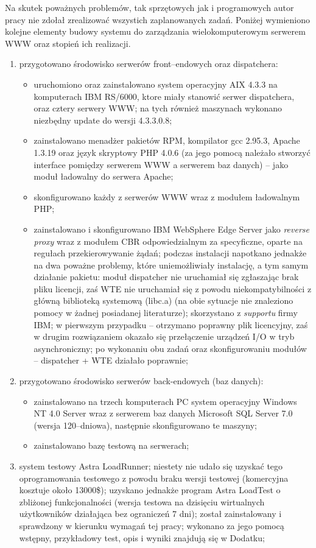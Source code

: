 Na skutek poważnych problemów, tak sprzętowych jak i programowych autor pracy nie zdołał 
zrealizować wszystich zaplanowanych zadań. Poniżej wymieniono kolejne elementy budowy systemu do zarządzania wielokomputerowym
serwerem WWW oraz stopień ich realizacji. 
\begin{enumerate}
\item przygotowano środowisko serwerów front--endowych oraz dispatchera:
\begin{itemize}
\item uruchomiono oraz zainstalowano system operacyjny AIX 4.3.3 na komputerach IBM RS/6000, ktore miały stanowić serwer
dispatchera, oraz cztery serwery WWW; na tych również maszynach wykonano niezbędny update do wersji 4.3.3.0.8;
\item zainstalowano menadżer pakietów RPM, kompilator gcc 2.95.3, Apache 1.3.19 oraz język skryptowy PHP 4.0.6 (za jego pomocą
należało stworzyć interface pomiędzy serwerem WWW a serwerem baz danych) -- jako moduł ładowalny do serwera Apache;
\item skonfigurowano każdy z serwerów WWW wraz z modułem ładowalnym PHP;
\item zainstalowano i skonfigurowano IBM WebSphere Edge Server jako \emph{reverse proxy} wraz z modułem CBR odpowiedzialnym
za specyficzne, oparte na regułach przekierowywanie żądań; podczas instalacji napotkano jednakże na dwa poważne problemy, które
uniemożliwiały instalację, a tym samym działanie pakietu: moduł dispatcher nie uruchamiał się zgłaszając brak pliku licencji,
zaś WTE nie uruchamiał się z powodu niekompatybilności z główną biblioteką systemową (libc.a) (na obie sytuacje nie znaleziono
pomocy w żadnej posiadanej literaturze); skorzystano z \emph{supportu} firmy IBM; w pierwszym przypadku -- otrzymano poprawny
plik licencyjny, zaś w drugim rozwiązaniem okazało się przełączenie urządzeń I/O w tryb asynchroniczny; po wykonaniu obu zadań
oraz skonfigurowaniu modułów -- dispatcher + WTE działało poprawnie;
\end{itemize}
\item przygotowano środowisko serwerów back-endowych (baz danych):
\begin{itemize}
\item zainstalowano na trzech komputerach PC system operacyjny Windows NT 4.0 Server wraz z serwerem baz danych Microsoft
SQL Server 7.0 (wersja 120--dniowa), następnie skonfigurowano te maszyny;
\item zainstalowano bazę testową na serwerach;
\end{itemize}
\item system testowy Astra LoadRunner; niestety nie udało się uzyskać tego oprogramowania testowego z powodu braku wersji 
testowej (komercyjna kosztuje około 13000\$); uzyskano jednakże program Astra LoadTest o zbliżonej funkcjonalności (wersja 
testowa na dzisięciu wirtualnych użytkowników działająca bez ograniczeń 7 dni); został zainstalowany i sprawdzony w kierunku
wymagań tej pracy; wykonano za jego pomocą wstępny, przykładowy test, opis i wyniki znajdują się 
w Dodatku;
\end{enumerate}

